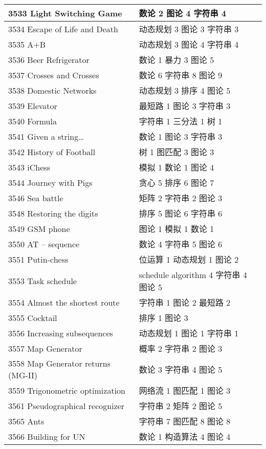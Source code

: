 \begin{longtable}{| p{} | p{} |}
 3533 Light Switching Game  & 数论 2 图论 4 字符串 4 \\ \hline
 3534 Escape of Life and Death  & 动态规划 3 图论 3 字符串 3 \\ \hline
 3535 A+B  & 动态规划 3 图论 4 字符串 4 \\ \hline
 3536 Beer Refrigerator  & 数论 1 暴力 3 图论 5 \\ \hline
 3537 Crosses and Crosses  & 数论 6 字符串 8 图论 9 \\ \hline
 3538 Domestic Networks  & 动态规划 3 排序 4 图论 5 \\ \hline
 3539 Elevator  & 最短路 1 图论 3 字符串 3 \\ \hline
 3540 Formula  & 字符串 1 三分法 1 树 1 \\ \hline
 3541 Given a string…  & 数论 1 图论 3 字符串 3 \\ \hline
 3542 History of Football  & 树 1 图匹配 3 图论 3 \\ \hline
 3543 iChess  & 模拟 1 数论 1 图论 4 \\ \hline
 3544 Journey with Pigs  & 贪心 5 排序 6 图论 7 \\ \hline
 3546 Sea battle  & 矩阵 2 字符串 2 图论 3 \\ \hline
 3548 Restoring the digits  & 排序 5 图论 6 字符串 6 \\ \hline
 3549 GSM phone  & 图论 1 模拟 1 数论 1 \\ \hline
 3550 AT – sequence  & 数论 4 字符串 5 图论 6 \\ \hline
 3551 Putin-chess  & 位运算 1 动态规划 1 图论 2 \\ \hline
 3553 Task schedule  & schedule algorithm 4 字符串 4 图论 5 \\ \hline
 3554 Almost the shortest route  & 字符串 1 图论 2 最短路 2 \\ \hline
 3555 Cocktail  & 排序 1 图论 3 \\ \hline
 3556 Increasing subsequences  & 动态规划 1 图论 1 字符串 1 \\ \hline
 3557 Map Generator  & 概率 2 字符串 2 图论 3 \\ \hline
 3558 Map Generator returns (MG-II)  & 数论 3 字符串 4 图论 5 \\ \hline
 3559 Trigonometric optimization  & 网络流 1 图匹配 1 图论 3 \\ \hline
 3561 Pseudographical recognizer  & 字符串 2 矩阵 2 图论 5 \\ \hline
 3565 Ants  & 字符串 7 图匹配 8 图论 8 \\ \hline
 3566 Building for UN  & 数论 1 构造算法 4 图论 4 \\ \hline

\end{longtable}
